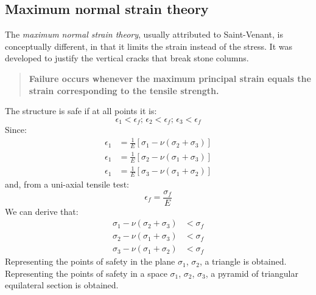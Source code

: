 \documentclass[class=report, crop=false, 12pt,a4paper]{standalone}
\begin{document}
\subsection{Maximum normal strain theory}
The \textit{maximum normal strain theory}, usually attributed to Saint-Venant, is conceptually different, in that it limits the strain instead of the stress. It was developed to justify the vertical cracks that break stone columns.
\begin{quotation}
  \textbf{Failure occurs whenever the maximum principal strain equals the strain corresponding to the tensile strength.}
\end{quotation}
The structure is safe if at all points it is:
\begin{equation}
  \epsilon_1 < \epsilon_f ; \, \epsilon_2 < \epsilon_f ; \, \epsilon_3 < \epsilon_f
\end{equation}
Since:
\begin{align}
  \epsilon_1 &= \frac{1}{E} \left[\sigma_1 - \nu \left(\sigma_2 + \sigma_3\right)\right]\\
  \epsilon_1 &= \frac{1}{E} \left[\sigma_2 - \nu \left(\sigma_1 + \sigma_3\right)\right]\\
  \epsilon_1 &= \frac{1}{E} \left[\sigma_3 - \nu \left(\sigma_1 + \sigma_2\right)\right]
\end{align}
and, from a uni-axial tensile test:
\begin{equation}
  \epsilon_f = \frac{\sigma_f}{E}
\end{equation}
We can derive that:
\begin{align}
  \sigma_1 - \nu \left(\sigma_2 + \sigma_3\right) &< \sigma_f\\
  \sigma_2 - \nu \left(\sigma_1 + \sigma_3\right) &< \sigma_f\\
  \sigma_3 - \nu \left(\sigma_1 + \sigma_2\right) &< \sigma_f
\end{align}
Representing the points of safety in the plane $\sigma_1$, $\sigma_2$, a triangle is obtained. Representing the points of safety in a space $\sigma_1$, $\sigma_2$, $\sigma_3$, a pyramid of triangular equilateral section is obtained.
\end{document}
